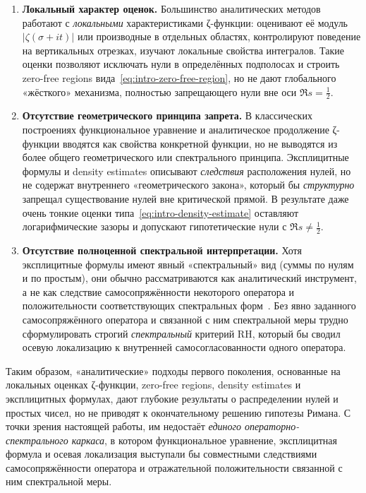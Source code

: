 \documentclass{article}
\numberwithin{equation}{section}
\theoremstyle{plain}
\theoremstyle{definition}
\theoremstyle{remark}
\begin{document}
\begin{enumerate}[label=(\alph*), leftmargin=2.2em]
  \item \textbf{Локальный характер оценок.}
  Большинство аналитических методов работают с \emph{локальными} характеристиками ζ-функции: оценивают её модуль $\lvert \zeta(\sigma+it)\rvert$ или производные в отдельных областях, контролируют поведение на вертикальных отрезках, изучают локальные свойства интегралов. 
  Такие оценки позволяют исключать нули в определённых подполосах и строить zero-free regions вида~\eqref{eq:intro-zero-free-region}, но не дают глобального «жёсткого» механизма, полностью запрещающего нули вне оси $\Re s=\tfrac12$.

  \item \textbf{Отсутствие геометрического принципа запрета.}
  В классических построениях функциональное уравнение и аналитическое продолжение ζ-функции вводятся как свойства конкретной функции, но не выводятся из более общего геометрического или спектрального принципа. 
  Эксплицитные формулы и density estimates описывают \emph{следствия} расположения нулей, но не содержат внутреннего «геометрического закона», который бы \emph{структурно} запрещал существование нулей вне критической прямой. 
  В результате даже очень тонкие оценки типа~\eqref{eq:intro-density-estimate} оставляют логарифмические зазоры и допускают гипотетические нули с $\Re s\ne\tfrac12$.

  \item \textbf{Отсутствие полноценной спектральной интерпретации.}
  Хотя эксплицитные формулы имеют явный «спектральный» вид (суммы по нулям и по простым), они обычно рассматриваются как аналитический инструмент, а не как следствие самосопряжённости некоторого оператора и положительности соответствующих спектральных форм~\cite{Edwards1974,Conrey2003}. 
  Без явно заданного самосопряжённого оператора и связанной с ним спектральной меры трудно сформулировать строгий \emph{спектральный} критерий RH, который бы сводил осевую локализацию к внутренней самосогласованности одного оператора.
\end{enumerate}

\noindent
Таким образом, «аналитические» подходы первого поколения, основанные на локальных оценках ζ-функции, zero-free regions, density estimates и эксплицитных формулах, дают глубокие результаты о распределении нулей и простых чисел, но не приводят к окончательному решению гипотезы Римана. 
С точки зрения настоящей работы, им недостаёт \emph{единого операторно-спектрального каркаса}, в котором функциональное уравнение, эксплицитная формула и осевая локализация выступали бы совместными следствиями самосопряжённости оператора и отражательной положительности связанной с ним спектральной меры.
\end{document}
